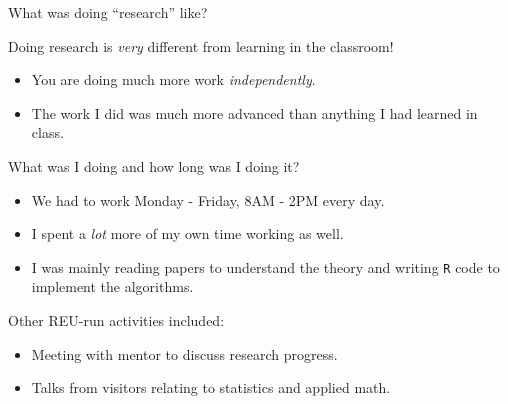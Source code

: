\documentclass[8pt]{beamer}
\newcommand{\mys}{\vspace{0.5cm} \pause
}
\begin{document}
    

\begin{frame}{What was doing ``research'' like?}

Doing research is \textit{very} different from learning in the classroom!
\begin{itemize}
    \item You are doing much more work \textit{independently}.
    \item The work I did was much more advanced than anything I had learned in class.
\end{itemize} \mys

What was I doing and how long was I doing it?
\begin{itemize}
    \item We had to work Monday - Friday, 8AM - 2PM every day.
    \item I spent a \textit{lot} more of my own time working as well.
    \item I was mainly reading papers to understand the theory and writing \texttt{R} code to implement the algorithms.
\end{itemize} \mys 

Other REU-run activities included:
\begin{itemize}
    \item Meeting with mentor to discuss research progress.
    \item Talks from visitors relating to statistics and applied math.
\end{itemize}
    
\end{frame}
\end{document}
